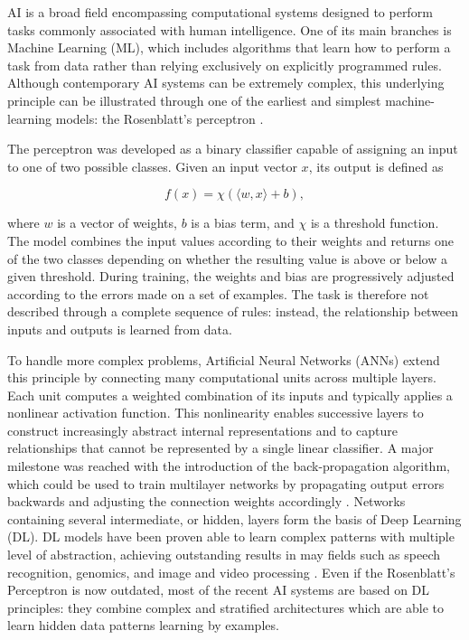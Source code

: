 AI is a broad field encompassing computational systems designed to perform tasks commonly associated with human intelligence. 
One of its main branches is Machine Learning (ML), which includes algorithms that learn how to perform a task from data rather than relying exclusively on explicitly programmed rules. Although contemporary AI systems can be extremely complex, this underlying principle can be illustrated through one of the earliest and simplest machine-learning models: the Rosenblatt's perceptron \citep{rosenblatt_perceptron_1958}.

The perceptron was developed as a binary classifier capable of assigning an input to one of two possible classes. Given an input vector $x$, its output is defined as

\begin{equation}
    f(x) = \chi\left(\langle w,x\rangle+b\right),
    \label{perceptron}
\end{equation}

where $w$ is a vector of weights, $b$ is a bias term, and $\chi$ is a threshold function. The model combines the input values according to their weights and returns one of the two classes depending on whether the resulting value is above or below a given threshold. During training, the weights and bias are progressively adjusted according to the errors made on a set of examples. The task is therefore not described through a complete sequence of rules: instead, the relationship between inputs and outputs is learned from data.

To handle more complex problems, Artificial Neural Networks (ANNs) extend this principle by connecting many computational units across multiple layers. Each unit computes a weighted combination of its inputs and typically applies a nonlinear activation function. This nonlinearity enables successive layers to construct increasingly abstract internal representations and to capture relationships that cannot be represented by a single linear classifier. A major milestone was reached with the introduction of the back-propagation algorithm, which could be used to train multilayer networks by propagating output errors backwards and adjusting the connection weights accordingly \citep{rumelhart_learning_1986}. Networks containing several intermediate, or hidden, layers form the basis of Deep Learning (DL). DL models have been proven able to learn complex patterns with multiple level of abstraction, achieving outstanding results in may fields such as speech recognition, genomics, and image and video processing   \citep{lecun_deep_2015}. Even if the Rosenblatt's Perceptron is now outdated, most of the recent AI systems are based on DL principles: they combine complex and stratified architectures which are able to learn hidden data patterns learning by examples.

